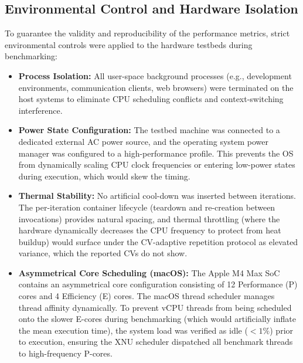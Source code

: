 \subsection{Environmental Control and Hardware Isolation}
To guarantee the validity and reproducibility of the performance metrics, strict environmental controls were applied to the hardware testbeds during benchmarking:
\begin{itemize}
    \item \textbf{Process Isolation:} All user-space background processes (e.g., development environments, communication clients, web browsers) were terminated on the host systems to eliminate CPU scheduling conflicts and context-switching interference.
    \item \textbf{Power State Configuration:} The testbed machine was connected to a dedicated external AC power source, and the operating system power manager was configured to a high-performance profile. This prevents the OS from dynamically scaling CPU clock frequencies or entering low-power states during execution, which would skew the timing.
    \item \textbf{Thermal Stability:} No artificial cool-down was inserted between iterations. The per-iteration container lifecycle (teardown and re-creation between invocations) provides natural spacing, and thermal throttling (where the hardware dynamically decreases the CPU frequency to protect from heat buildup) would surface under the CV-adaptive repetition protocol as elevated variance, which the reported CVs do not show.
    \item \textbf{Asymmetrical Core Scheduling (macOS):} The Apple M4 Max SoC contains an asymmetrical core configuration consisting of 12 Performance (P) cores and 4 Efficiency (E) cores. The macOS thread scheduler manages thread affinity dynamically. To prevent vCPU threads from being scheduled onto the slower E-cores during benchmarking (which would artificially inflate the mean execution time), the system load was verified as idle ($<1\%$) prior to execution, ensuring the XNU scheduler dispatched all benchmark threads to high-frequency P-cores.
\end{itemize}

